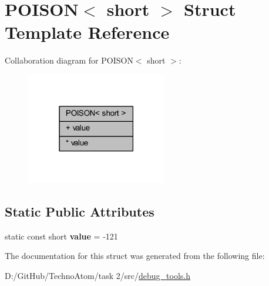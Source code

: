 \hypertarget{struct_p_o_i_s_o_n_3_01short_01_4}{}\section{P\+O\+I\+S\+ON$<$ short $>$ Struct Template Reference}
\label{struct_p_o_i_s_o_n_3_01short_01_4}


Collaboration diagram for P\+O\+I\+S\+ON$<$ short $>$\+:
\nopagebreak
\begin{figure}[H]
\begin{center}
\leavevmode
\includegraphics[width=174pt]{struct_p_o_i_s_o_n_3_01short_01_4__coll__graph}
\end{center}
\end{figure}
\subsection*{Static Public Attributes}
\textbf{ }\par
\begin{DoxyCompactItemize}
\item 
\mbox{\label{struct_p_o_i_s_o_n_3_01short_01_4_a01dfef4676ecb3ae01b25c8e239d7d7f}} 
static const short {\bfseries value} = -\/121
\end{DoxyCompactItemize}



The documentation for this struct was generated from the following file\+:\begin{DoxyCompactItemize}
\item 
D\+:/\+Git\+Hub/\+Techno\+Atom/task 2/src/\hyperlink{debug__tools_8h}{debug\+\_\+tools.\+h}\end{DoxyCompactItemize}
